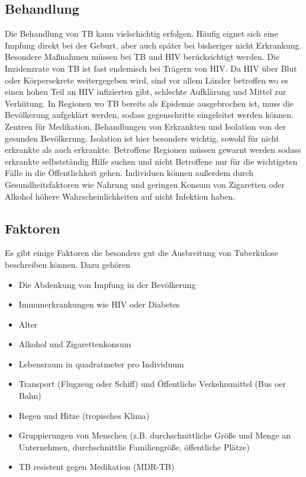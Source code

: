 \documentclass[paper=a4, fontsize=11pt, ngerman, abstract=on]{scrartcl}
\numberwithin{equation}{section} %
\numberwithin{figure}{section} %
\numberwithin{table}{section} %
\begin{document}
\subsection{Behandlung}

Die Behandlung von TB kann vielschichtig erfolgen. Häufig eignet sich eine Impfung direkt bei der Geburt, aber auch später bei bisheriger nicht Erkrankung. Besondere Maßnahmen müssen bei TB und HIV berücksichtigt werden. Die Inzidenzrate von TB ist fast endemisch bei Trägern von HIV. Da HIV über Blut oder Körpersekrete weitergegeben wird, sind vor allem Länder betroffen wo es einen hohen Teil an HIV infizierten gibt, schlechte Aufklärung und Mittel zur Verhütung. In Regionen wo TB bereits als Epidemie ausgebrochen ist, muss die Bevölkerung aufgeklärt werden, sodass gegenschritte eingeleitet werden können. Zentren für Medikation, Behandlungen von Erkrankten und Isolation von der gesunden Bevölkerung. Isolation ist hier besonders wichtig, sowohl für nicht erkrankte als auch erkrankte. Betroffene Regionen müssen gewarnt werden sodass erkrankte selbstständig Hilfe suchen und nicht Betroffene nur für die wichtigsten Fälle in die Öffentlichkeit gehen. Individuen können außerdem durch Gesundheitsfaktoren wie Nahrung und geringen Konsum von Zigaretten oder Alkohol höhere Wahrscheinlichkeiten auf nicht Infektion haben. \cite{WHOTBGuidelines2017}

\subsection{Faktoren}

Es gibt einige Faktoren die besonders gut die Ausbreitung von Tuberkulose beschreiben können. Dazu gehören

\begin{itemize}
  \item Die Abdenkung von Impfung in der Bevölkerung
  \item Immunerkrankungen wie HIV oder Diabetes
  \item Alter
  \item Alkohol und Zigarettenkonsum
  \item Lebensraum in quadratmeter pro Individuum
  \item Transport (Flugzeug oder Schiff) und Öffentliche Verkehrsmittel (Bus oer Bahn)
  \item Regen und Hitze (tropisches Klima)
  \item Gruppierungen von Menschen (z.B. durchschnittliche Größe und Menge an Unternehmen, durchschnittlie Familiengröße, öffentliche Plätze)
  \item TB resistent gegen Medikation (MDR-TB)
\end{itemize}
\end{document}
